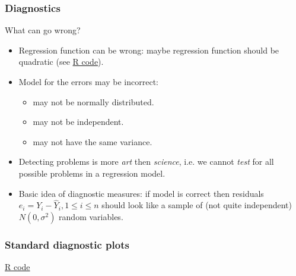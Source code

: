 \documentclass[handout]{beamer}
\newcommand{\basename}[1]{http://stats191.stanford.edu/#1}
\newcommand{\mycolor}[1]{{\color{blue} #1}}
\newcommand{\Rhref}[2]{\href{\basename{R/#1}}{\mycolor{#2}}}
\begin{document}
   \begin{frame} \frametitle{Diagnostics}

   \begin{block}
   {What can go wrong?}

   \begin{itemize}[<+->]

   \item
   Regression function can be wrong: maybe regression function should be quadratic
   (see \Rhref{simple_diagnostics/anscombeout.html}{R code}).

   \item Model for the errors
   may be incorrect:
   \begin{itemize}
   \item  may not be normally distributed.
   \item  may not be independent.

   \item  may not have the same variance.
   \end{itemize}

   \item Detecting problems is more {\em art} then {\em science}, i.e.
   we cannot {\em test} for all possible problems in a regression model.

   \item Basic idea of diagnostic measures: if model is correct then
   residuals $e_i = Y_i -\widehat{Y}_i, 1 \leq i \leq n$ should look like a sample of
   (not quite independent) $N(0, \sigma^2)$ random variables.
   \end{itemize}
   \end{block}
   \end{frame}



   \begin{frame}
   \frametitle{Standard diagnostic plots}
   \begin{center}
   \end{center}
   \href{http://stats191.stanford.edu/diagnostics.html#standard-diagnostic-plots}{R code}
   \end{frame}

\end{document}
